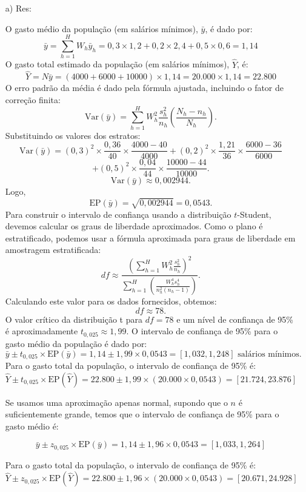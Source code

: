 \documentclass[a4paper,12pt,oneside,twocolumn]{Config/milktest}
\begin{document}
 {\tiny 
\begin{itemize}
    \item[a) Res:] 

O gasto médio da população (em salários mínimos), $\bar{y}$, é dado por:\[
\bar{y} = \sum_{h=1}^{H} W_h \bar{y}_h = 0,3 \times 1,2 + 0,2 \times 2,4 + 0,5 \times 0,6 = 1,14
\] 
O gasto total estimado da população (em salários mínimos), $\hat{Y}$, é:
\[
\hat{Y} = N \bar{y} = (4000 + 6000 + 10000) \times 1,14 = 20.000 \times 1,14 = 22.800 
\]
O erro padrão da média é dado pela fórmula ajustada, incluindo o fator de correção finita:
\[
\text{Var}(\bar{y}) = \sum_{h=1}^{H} W_h^2 \frac{s_h^2}{n_h} \left(\frac{N_h - n_h}{N_h}\right).
\]
Substituindo os valores dos estratos:
\[
\text{Var}(\bar{y}) = (0,3)^2 \times \frac{0,36}{40} \times \frac{4000 - 40}{4000} + (0,2)^2 \times \frac{1,21}{36} \times \frac{6000 - 36}{6000} 
\]
\[+ (0,5)^2 \times \frac{0,04}{44} \times \frac{10000 - 44}{10000}.
\]
\[
\text{Var}(\bar{y}) \approx 0,002944.
\] Logo, 
\[
\text{EP}(\bar{y}) = \sqrt{0,002944} = 0,0543.
\]
Para construir o intervalo de confiança usando a distribuição $t$-Student, devemos calcular os graus de liberdade aproximados. Como o plano é estratificado, podemos usar a fórmula aproximada para graus de liberdade em amostragem estratificada:
\[
df \approx \frac{\left(\sum_{h=1}^{H} W_h^2 \frac{s_h^2}{n_h} \right)^2}{\sum_{h=1}^{H} \left(\frac{W_h^4 s_h^4}{n_h^2 (n_h - 1)}\right)}.
\]
Calculando este valor para os dados fornecidos, obtemos:
\[
df \approx 78.
\]
O valor crítico da distribuição t para $df = 78$ e um nível de confiança de 95\% é aproximadamente $t_{0,025} \approx 1,99$.
O intervalo de confiança de 95\% para o gasto médio da população é dado por:
\[
\bar{y} \pm t_{0,025} \times \text{EP}(\bar{y}) = 1,14 \pm 1,99 \times 0,0543 = [1,032, 1,248] \text{ salários mínimos.}
\]
Para o gasto total da população, o intervalo de confiança de 95\% é:
\[
\hat{Y} \pm t_{0,025} \times \text{EP}(\hat{Y}) = 22.800 \pm 1,99 \times (20.000 \times 0,0543) = [21.724, 23.876] 
\]

Se usamos uma aproximação apenas normal, supondo que o $n$ é suficientemente grande, temos que o intervalo de confiança de 95\% para o gasto médio é:

\[
\bar{y} \pm z_{0,025} \times \text{EP}(\bar{y}) = 1,14 \pm 1,96 \times 0,0543 = [1,033, 1,264] 
\]

Para o gasto total da população, o intervalo de confiança de 95\% é:
\[
\hat{Y} \pm z_{0,025} \times \text{EP}(\hat{Y}) = 22.800 \pm 1,96 \times (20.000 \times 0,0543) = [20.671, 24.928] 
\]
 

\end{itemize}}
\end{document}
